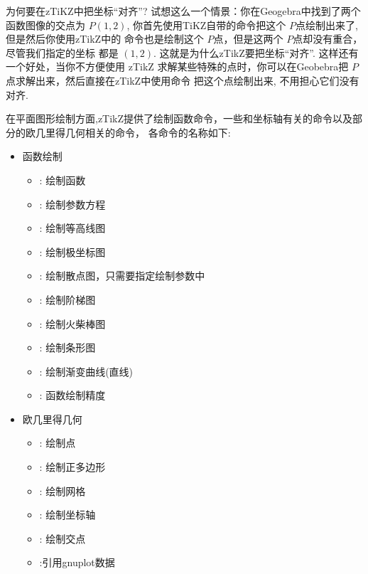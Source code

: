 为何要在zTiKZ中把坐标``对齐''? 试想这么一个情景：你在Geogebra中找到了两个函数图像的交点为 $P(1, 2)$,
你首先使用TiKZ自带的\cmd{\filldraw}命令把这个 $P$点绘制出来了, 但是然后你使用zTikZ中的
\cmd{\ShowPoint}命令也是绘制这个 $P$点，但是这两个 $P$点却没有重合，尽管我们指定的坐标
都是 $(1, 2)$. 这就是为什么zTikZ要把坐标``对齐''. 这样还有一个好处，当你不方便使用 zTikZ 
求解某些特殊的点时，你可以在Geobebra把 $P$点求解出来，然后直接在zTikZ中使用\cmd{\ShowPoint}命令
把这个点绘制出来, 不用担心它们没有对齐.

在平面图形绘制方面,zTikZ提供了绘制函数命令，一些和坐标轴有关的命令以及部分的欧几里得几何相关的命令，
各命令的名称如下:

\begin{multicols}{2}
\begin{itemize}
    \item 函数绘制
        \begin{itemize}
            \item \cmd{\Plot}\index{\cmd{\Plot}}: 绘制函数
            \item \cmd{\ParamPlot}\index{\cmd{\ParamPlot}}: 绘制参数方程
            \item \cmd{\ContourPlot}\index{\cmd{\ContourPlot}}: 绘制等高线图
            \item \cmd{\PolarPlot}\index{\cmd{\PolarPlot}}: 绘制极坐标图
            \item \cmd{\ListPlot}\index{\cmd{\ListPlot}}: 绘制散点图，只需要指定绘制参数中
            \item \cmd{\StairsPlot}\index{\cmd{\StairsPlot}}: 绘制阶梯图
            \item \cmd{\StemPlot}\index{\cmd{\StemPlot}}: 绘制火柴棒图
            \item \cmd{\BarPlot}\index{\cmd{\BarPlot}}: 绘制条形图
            \item \cmd{\ShadePlot}\index{\cmd{\ShadePlot}}: 绘制渐变曲线(直线)
            \item \cmd{\PlotPrecise}\index{\cmd{\PlotPrecise}}: 函数绘制精度
        \end{itemize}
    \item 欧几里得几何 
        \begin{itemize}
            \item \cmd{\ShowPoint}\index{\cmd{\ShowPoint}}: 绘制点
            \item \cmd{\Polygon}\index{\cmd{\Polygon}}: 绘制正多边形
            \item \cmd{\ShowGrid}\index{\cmd{\ShowGrid}}: 绘制网格 
            \item \cmd{\ShowAxis}\index{\cmd{\ShowAxis}}: 绘制坐标轴
            \item \cmd{\ShowIntersection}\index{\cmd{\ShowIntersection}}: 绘制交点
            \item \cmd{\gnudata}\index{\cmd{\gnudata}}:引用gnuplot数据
        \end{itemize}
\end{itemize}
\end{multicols}

